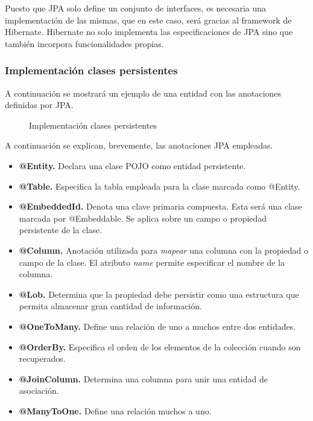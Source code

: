 Puesto que JPA solo define un conjunto de interfaces, es necesaria una implementación de las mismas, que en este caso, será gracias al framework de Hibernate. Hibernate no solo implementa las especificaciones de JPA sino que también incorpora funcionalidades propias.


\subsubsection*{Implementación clases persistentes}
A continuación se mostrará un ejemplo de una entidad con las anotaciones definidas por JPA.

\begin{figure}[H]
\centering
{}
\caption{Implementación clases persistentes}
\end{figure}

A continuación se explican, brevemente, las anotaciones JPA empleadas.

\begin{itemize}
	\item \textbf{@Entity. }Declara una clase POJO como entidad persistente. 
	\item \textbf{@Table. }Especifica la tabla empleada para la clase marcada como @Entity. 
	\item \textbf{@EmbeddedId. }Denota una clave primaria compuesta. Esta será una clase marcada por @Embeddable. Se aplica sobre un campo o propiedad persistente de la clase.
	\item \textbf{@Column. }Anotación utilizada para \textit{mapear} una columna con la propiedad o campo de la clase. El atributo \textit{name} permite especificar el nombre de la columna.
	\item \textbf{@Lob. } Determina que la propiedad debe persistir como una estructura que permita almacenar gran cantidad de información.
	\item \textbf{@OneToMany. }Define una relación de uno a muchos entre dos entidades. 
	\item \textbf{@OrderBy. }Especifica el orden de los elementos de la colección cuando son recuperados.
	\item \textbf{@JoinColumn. }Determina una columna para unir una entidad de asociación.
	\item \textbf{@ManyToOne. }Define una relación muchos a uno.
\end{itemize}



